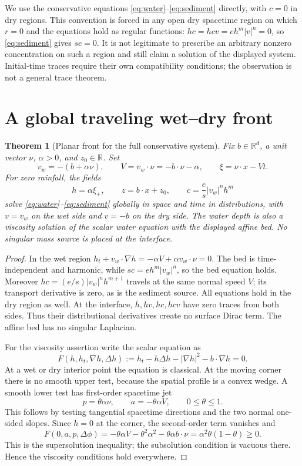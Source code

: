 \documentclass[11pt,a4paper]{article}
\newtheorem{theorem}{Theorem}[section]
\theoremstyle{remark}\newtheorem{remark}[theorem]{Remark}
\newcommand{\R}{\mathbb R}\newcommand{\divg}{\operatorname{div}}\newcommand{\dd}{\,\mathrm d}
\begin{document}
We use the conservative equations \eqref{eq:water}--\eqref{eq:sediment} directly, with $c=0$ in dry regions. This convention is forced in any open dry spacetime region on which $r=0$ and the equations hold as regular functions: $hc=hcv=eh^m|v|^n=0$, so \eqref{eq:sediment} gives $sc=0$. It is not legitimate to prescribe an arbitrary nonzero concentration on such a region and still claim a solution of the displayed system. Initial-time traces require their own compatibility conditions; the observation is not a general trace theorem.

\section{A global traveling wet--dry front}
\begin{theorem}[Planar front for the full conservative system]\label{thm:front}
Fix $b\in\R^d$, a unit vector $\nu$, $\alpha>0$, and $z_0\in\R$. Set
\[
 v_w=-(b+\alpha\nu),\qquad V=v_w\cdot\nu=-b\cdot\nu-\alpha,
 \qquad \xi=\nu\cdot x-Vt.
\]
For zero rainfall, the fields
\begin{equation}
 h=\alpha\xi_+,\qquad z=b\cdot x+z_0,\qquad
 c=\frac es|v_w|^n h^m\label{eq:front}
\end{equation}
solve \eqref{eq:water}--\eqref{eq:sediment} globally in space and time in distributions, with $v=v_w$ on the wet side and $v=-b$ on the dry side. The water depth is also a viscosity solution of the scalar water equation with the displayed affine bed. No singular mass source is placed at the interface.
\end{theorem}
\begin{proof}
In the wet region $h_t+v_w\cdot\nabla h=-\alpha V+\alpha v_w\cdot\nu=0$. The bed is time-independent and harmonic, while $sc=eh^m|v_w|^n$, so the bed equation holds. Moreover $hc=(e/s)|v_w|^n h^{m+1}$ travels at the same normal speed $V$; its transport derivative is zero, as is the sediment source. All equations hold in the dry region as well. At the interface, $h,hv,hc,hcv$ have zero traces from both sides. Thus their distributional derivatives create no surface Dirac term. The affine bed has no singular Laplacian.

For the viscosity assertion write the scalar equation as
\[
 F(h,h_t,\nabla h,\Delta h):=h_t-h\Delta h-|\nabla h|^2-b\cdot\nabla h=0.
\]
At a wet or dry interior point the equation is classical. At the moving corner there is no smooth upper test, because the spatial profile is a convex wedge. A smooth lower test has first-order spacetime jet
\[
 p=\theta\alpha\nu,\qquad a=-\theta\alpha V,
 \qquad 0\leq\theta\leq1.
\]
This follows by testing tangential spacetime directions and the two normal one-sided slopes. Since $h=0$ at the corner, the second-order term vanishes and
\[
 F(0,a,p,\Delta\phi)
 =-\theta\alpha V-\theta^2\alpha^2-\theta\alpha b\cdot\nu
 =\alpha^2\theta(1-\theta)\geq0.
\]
This is the supersolution inequality; the subsolution condition is vacuous there. Hence the viscosity conditions hold everywhere.
\end{proof}
\end{document}
